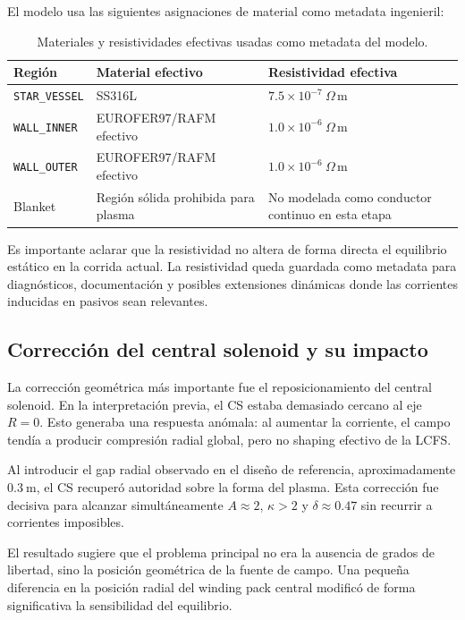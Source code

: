 \documentclass[11pt,a4paper]{article}
\begin{document}
El modelo usa las siguientes asignaciones de material como metadata ingenieril:

\begin{table}[htbp]
\centering
\caption{Materiales y resistividades efectivas usadas como metadata del modelo.}
\label{tab:materials_metadata}
\begin{tabular}{lll}
\toprule
\textbf{Región} & \textbf{Material efectivo} & \textbf{Resistividad efectiva} \\
\midrule
\texttt{STAR\_VESSEL} & SS316L & $7.5\times10^{-7}~\Omega\,\mathrm{m}$ \\
\texttt{WALL\_INNER} & EUROFER97/RAFM efectivo & $1.0\times10^{-6}~\Omega\,\mathrm{m}$ \\
\texttt{WALL\_OUTER} & EUROFER97/RAFM efectivo & $1.0\times10^{-6}~\Omega\,\mathrm{m}$ \\
Blanket & Región sólida prohibida para plasma & No modelada como conductor continuo en esta etapa \\
\bottomrule
\end{tabular}
\end{table}

Es importante aclarar que la resistividad no altera de forma directa el equilibrio estático en
la corrida actual. La resistividad queda guardada como metadata para diagnósticos, documentación
y posibles extensiones dinámicas donde las corrientes inducidas en pasivos sean relevantes.

\subsection{Corrección del central solenoid y su impacto}
La corrección geométrica más importante fue el reposicionamiento del central solenoid. En la
interpretación previa, el CS estaba demasiado cercano al eje $R=0$. Esto generaba una respuesta
anómala: al aumentar la corriente, el campo tendía a producir compresión radial global, pero no
shaping efectivo de la LCFS.

Al introducir el gap radial observado en el diseño de referencia, aproximadamente
$0.3~\mathrm{m}$, el CS recuperó autoridad sobre la forma del plasma. Esta corrección fue decisiva
para alcanzar simultáneamente $A\approx2$, $\kappa>2$ y $\delta\approx0.47$ sin recurrir a
corrientes imposibles.

El resultado sugiere que el problema principal no era la ausencia de grados de libertad, sino
la posición geométrica de la fuente de campo. Una pequeña diferencia en la posición radial del
winding pack central modificó de forma significativa la sensibilidad del equilibrio.
\end{document}
